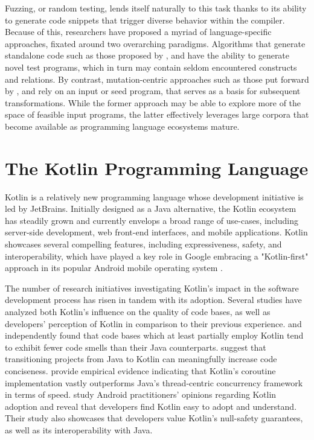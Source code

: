 Fuzzing, or random testing, lends itself naturally to this task thanks to its
ability to generate code snippets that trigger diverse behavior within the compiler.
Because of this, researchers have proposed a myriad of language-specific approaches, 
fixated around two overarching paradigms.
Algorithms that generate standalone code such as those proposed by  
\citet{yang2011finding, holler2012fuzzing, veggalam2016ifuzzer}, and \citet{havrikov2019systematically}
have the ability to generate novel test programs, which in turn may contain
seldom encountered constructs and relations.
By contrast, mutation-centric approaches such as those put forward by 
\citet{le2014compiler, le2015finding, sun2016finding}, and \citet{stepanov2021type}
rely on an input or seed program, that serves as a basis for subsequent transformations.
While the former approach may be able to explore more of the
space of feasible input programs, the latter effectively leverages
large corpora that become available as programming language
ecosystems mature.

\section{The Kotlin Programming Language}

Kotlin \cite{kotlinlang} is a relatively new programming language whose development
initiative is led by JetBrains.
Initially designed as a Java alternative, the Kotlin
ecosystem has steadily grown and currently envelops
a broad range of use-cases, including server-side development,
web front-end interfaces, and mobile applications. 
Kotlin showcases several compelling features, including expressiveness,
safety, and interoperability, which have played a key role in Google embracing
a "Kotlin-first" approach in its popular Android mobile operating system \cite{kotlinfirst}.

The number of research initiatives investigating Kotlin's impact 
in the software development process has risen in tandem with its adoption.
Several studies have analyzed both Kotlin's influence
on the quality of code bases, as well as developers' perception
of Kotlin in comparison to their previous experience.
\citet{flauzino2018you}  and \citet{gois2019empirical} independently
found that code bases which at least partially employ Kotlin tend to
exhibit fewer code smells than their Java counterparts. 
\citet{ardito2020effectiveness} suggest that transitioning projects
from Java to Kotlin can meaningfully increase code conciseness.
\citet{chauhan2021performance} provide empirical evidence indicating
that Kotlin's coroutine implementation vastly outperforms
Java's thread-centric concurrency framework in terms of speed.
\citet{oliveira2020adoption} study Android practitioners' opinions regarding
Kotlin adoption and reveal that developers find Kotlin easy
to adopt and understand. 
Their study also showcases that developers value Kotlin's
null-safety guarantees, as well as its interoperability with Java.

